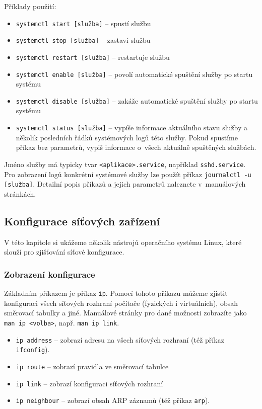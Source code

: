 Příklady použití: 
\begin{itemize}
  \item \texttt{systemctl start [služba]} -- spustí službu
  \item \texttt{systemctl stop [služba]} -- zastaví službu
  \item \texttt{systemctl restart [služba]} -- restartuje službu
  \item \texttt{systemctl enable [služba]} -- povolí automatické spuštění služby po startu systému
  \item \texttt{systemctl disable [služba]} -- zakáže automatické spuštění služby po startu systému
  \item \texttt{systemctl status [služba]} -- vypíše informace aktuálního stavu služby a několik posledních řádků systémových logů této služby. Pokud spustíme příkaz bez parametrů, vypiš  informace
        o~všech aktuálně spuštěných službách.
\end{itemize}

Jméno služby má typicky tvar \texttt{<aplikace>.service}, například
\texttt{sshd.service}. Pro zobrazení logů konkrétní systémové služby lze použít příkaz \texttt{journalctl -u [služba]}. Detailní popis příkazů a jejich parametrů naleznete v~manuálových stránkách.

\subsection{Konfigurace síťových zařízení} \label{basic_ipconfig}
V této kapitole si ukážeme několik nástrojů operačního systému Linux, které slouží pro zjišťování síťové konfigurace.

\subsubsection{Zobrazení konfigurace}
Základním příkazem je příkaz \texttt{ip}. Pomocí tohoto příkazu můžeme zjistit konfiguraci všech síťových rozhraní počítače (fyzických i virtuálních), obsah směrovací tabulky a jiné. Manuálové stránky pro dané možnosti zobrazíte jako \texttt{man ip <volba>}, např. {\tt man ip link}.

\begin{itemize}
  \item \texttt{ip address} -- zobrazí adresu na všech síťových rozhraní (též příkaz {\tt ifconfig}). 
  \item \texttt{ip route} -- zobrazí pravidla ve směrovací tabulce
  \item \texttt{ip link} -- zobrazí konfiguraci síťových rozhraní
  \item \texttt{ip neighbour} -- zobrazí obsah ARP záznamů (též příkaz \texttt{arp}).
\end{itemize}

